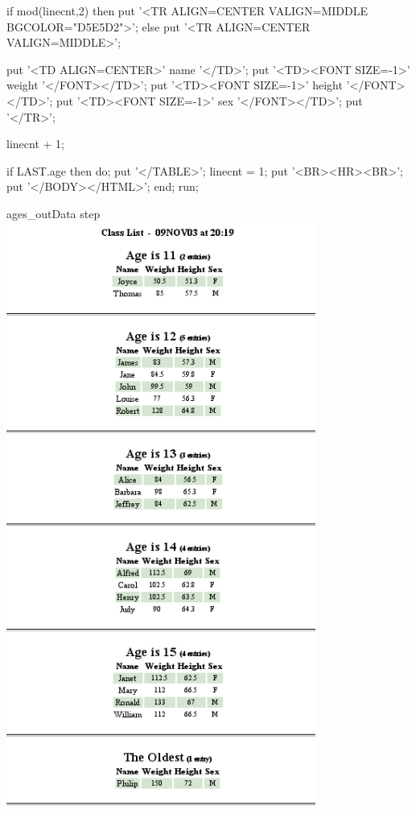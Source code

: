 \begin{sfvcode}
   if mod(linecnt,2) then
      put '<TR ALIGN=CENTER VALIGN=MIDDLE BGCOLOR="D5E5D2">';
   else
      put '<TR ALIGN=CENTER VALIGN=MIDDLE>';

   put '<TD ALIGN=CENTER>' name '</TD>';
   put '<TD><FONT SIZE=-1>' weight '</FONT></TD>';
   put '<TD><FONT SIZE=-1>' height '</FONT></TD>';
   put '<TD><FONT SIZE=-1>' sex '</FONT></TD>';
   put '</TR>';

   linecnt + 1;

   if LAST.age then do;
      put '</TABLE>';
      linecnt = 1;
      put '<BR><HR><BR>';
      put '</BODY></HTML>';
   end;
run;

\end{sfvcode}

\begin{goutput}{ages_out}{Data step}
\includegraphics[width=4in]{ages.png}
\end{goutput}


